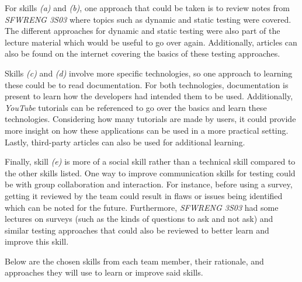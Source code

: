 \documentclass[12pt, titlepage]{article}
\begin{document}
\begin{enumerate}
  For skills \textit{(a)} and \textit{(b)}, one approach that could be taken is to review notes from
  \textit{SFWRENG 3S03} where topics such as dynamic and static testing were covered. The different
  approaches for dynamic and static testing were also part of the lecture material which would be useful to go over again.
  Additionally, articles can also be found on the internet covering the basics of these
  testing approaches. \par

  Skills \textit{(c)} and \textit{(d)} involve more specific technologies, so one approach to learning these
  could be to read documentation. For both technologies, documentation is present to learn how the
  developers had intended them to be used. Additionally, \textit{YouTube} tutorials can be referenced to
  go over the basics and learn these technologies. Considering how many tutorials are made by users, it
  could provide more insight on how these applications can be used in a more practical setting.
  Lastly, third-party articles can also be used for additional learning. \par

  Finally, skill \textit{(e)} is more of a social skill rather than a technical skill compared to the other skills listed.
  One way to improve communication skills for testing could be with group collaboration and
  interaction. For instance, before using a survey, getting it reviewed by the team could result in flaws or issues
  being identified which can be noted for the future. Furthermore, \textit{SFWRENG 3S03} had some lectures on surveys
  (such as the kinds of questions to ask and not ask) and similar testing approaches that could also be reviewed to better
  learn and improve this skill.

  Below are the chosen skills from each team member, their rationale, and approaches they will use to learn or
  improve said skills.


\end{enumerate}
\end{document}
